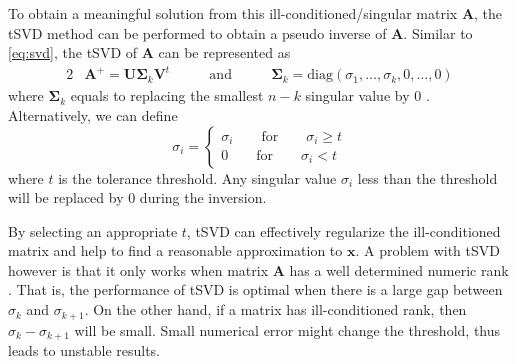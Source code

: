 			To obtain a meaningful solution from this ill-conditioned/singular matrix $\boldsymbol{A}$, the \gls{tSVD} method can be performed to obtain a pseudo inverse of $\boldsymbol{A}$.
			Similar to \cref{eq:svd}, the \gls{tSVD} of $\boldsymbol{A}$ can be represented as 
			\begin{alignat}{2}
				&\boldsymbol{A}^+ = \boldsymbol{U\Sigma}_k\boldsymbol{V}^t  &\qquad\text{and}\qquad  &\boldsymbol{\Sigma}_k=\mathrm{diag}(\sigma_1,\dots,\sigma_k,0,\dots,0)
				\label{eq:tsvd}				
			\end{alignat}
			where $\boldsymbol{\Sigma}_k$ equals to replacing the smallest $n-k$ singular value by 0 \citep{Hansen1987}. 
			Alternatively, we can define
			\begin{equation}
			\sigma_i=\begin{cases}
			\sigma_i\qquad\text{for}\qquad\sigma_i\ge t\\
			0\qquad\text{for}\qquad\sigma_i<t
			\end{cases}
			\end{equation}
			where $t$ is the tolerance threshold. 
			Any singular value $\sigma_i$ less than the threshold will be replaced by 0 during the inversion.
			
			By selecting an appropriate $t$, \gls{tSVD} can effectively regularize the ill-conditioned matrix and help to find a reasonable approximation to $\boldsymbol{x}$. 
			A problem with \gls{tSVD} however is that it only works when matrix $\boldsymbol{A}$ has a well determined numeric rank \citep{Hansen1987}.
			That is, the performance of \gls{tSVD} is optimal when there is a large gap between $\sigma_k$ and $\sigma_{k+1}$.
			On the other hand, if a matrix has ill-conditioned rank, then $\sigma_k-\sigma_{k+1}$ will be small.
			Small numerical error might change the threshold, thus leads to unstable results.
			 
